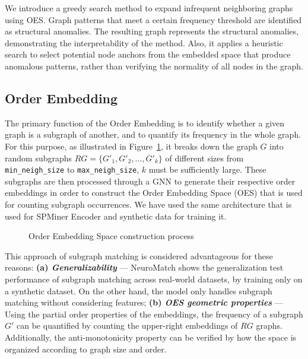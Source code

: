 \documentclass[pdflatex,sn-mathphys-num]{sn-jnl}%
\theoremstyle{thmstyleone}%
\theoremstyle{thmstyletwo}%
\theoremstyle{thmstylethree}%
\begin{document}
We introduce a greedy search method to expand infrequent neighboring graphs using OES. Graph patterns that meet a certain frequency threshold are identified as structural anomalies. The resulting graph represents the structural anomalies, demonstrating the interpretability of the method. Also, it applies a heuristic search to select potential node anchors from  the embedded space that produce anomalous patterns, rather than verifying the normality of all nodes in the graph.

\subsection{Order Embedding}
The primary function of the Order Embedding is to identify whether a given graph is a subgraph of another, and to quantify its frequency in the whole graph. For this purpose, as illustrated in Figure~\ref{fig:encoder_process}, it breaks down the graph $G$ into random subgraphs $RG=\{G'_1, G'_2, \dots, G'_k\}$ of different sizes from \texttt{min\_neigh\_size} to \texttt{max\_neigh\_size}, $k$ must be sufficiently large. These subgraphs are then processed through a GNN to generate their respective order embeddings in order to construct the Order Embedding Space (OES) that is used for counting subgraph occurrences. We have used the same architecture that is used for SPMiner Encoder \cite{ying2024representation} and synthetic data for training it. 
\vspace*{-13pt}
\begin{figure}[H]
    \centering
    \resizebox{0.73\linewidth}{!}{}
    \caption{\footnotesize Order Embedding Space construction process}
    \label{fig:encoder_process}
\end{figure}

This approach of subgraph matching is considered advantageous for these reasons:
\textbf{(a) \textit{Generalizability}} --- NeuroMatch shows the generalization test performance of subgraph matching across real-world datasets, by training only on a synthetic dataset. On the other hand, the model only handles subgraph matching without considering features;
\textbf{(b) \textit{OES geometric properties}} --- Using the partial order properties of the embeddings, the frequency of a subgraph $G'$ can be quantified by counting the upper-right embeddings of $RG$ graphs. Additionally, the anti-monotonicity property can be verified by how the space is organized according to graph size and order.
\end{document}
